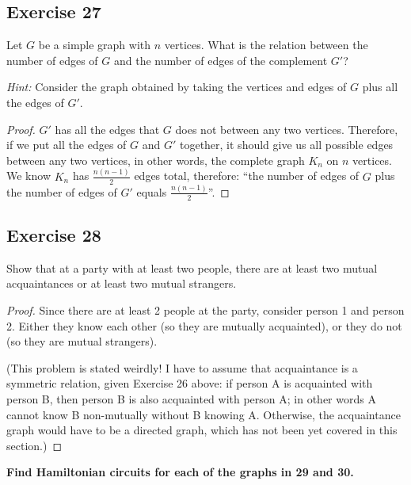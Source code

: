 \documentclass[14pt]{extarticle}
\newcommand{\cy}{\color{cyan}}
\begin{document}
\subsection{Exercise 27}
Let \(G\) be a simple graph with \(n\) vertices. What is the relation between the number of edges of \(G\) and the number
of edges of the complement \(G'\)?

{\it Hint:} Consider the graph obtained by taking the vertices and edges of \(G\) plus all the edges of \(G'\).

\begin{proof}
    \(G'\) has all the edges that \(G\) does not between any two vertices. Therefore, if we put all the edges of \(G\) and
    \(G'\) together, it should give us all possible edges between any two vertices, in other words, the complete graph \(K_n\)
    on \(n\) vertices. We know \(K_n\) has \(\frac{n(n-1)}{2}\) edges total, therefore: ``the number of edges of \(G\) plus
    the number of edges of \(G'\) equals \(\frac{n(n-1)}{2}\)''.
\end{proof}

\subsection{Exercise 28}
Show that at a party with at least two people, there are at least two mutual acquaintances or at least two mutual
strangers.

\begin{proof}
    Since there are at least 2 people at the party, consider person 1 and person 2. Either they know each other (so they
    are mutually acquainted), or they do not (so they are mutual strangers).

    (This problem is stated weirdly! I have to assume that acquaintance is a symmetric relation, given Exercise 26 above:
    if person A is acquainted with person B, then person B is also acquainted with person A; in other words A cannot know B
    non-mutually without B knowing A. Otherwise, the acquaintance graph would have to be a directed graph, which has not been
    yet covered in this section.)
\end{proof}

{\bf \cy Find Hamiltonian circuits for each of the graphs in 29 and 30.}
\end{document}
